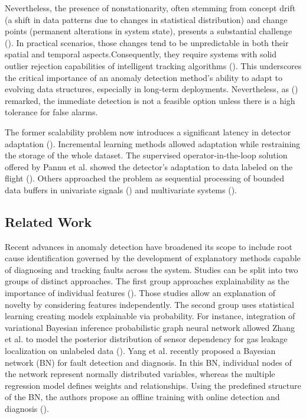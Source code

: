 Nevertheless, the presence of nonstationarity, often stemming from concept drift (a shift in data patterns due to changes in statistical distribution) and change points (permanent alterations in system state), presents a substantial challenge (\cite{Salehi2018}). In practical scenarios, those changes tend to be unpredictable in both their spatial and temporal aspects.Consequently, they require systems with solid outlier rejection capabilities of intelligent tracking algorithms (\cite{Barbosa2019162}). This underscores the critical importance of an anomaly detection method's ability to adapt to evolving data structures, especially in long-term deployments. Nevertheless, as (\cite{Tartakovsky2013}) remarked, the immediate detection is not a feasible option unless there is a high tolerance for false alarms.

The former scalability problem now introduces a significant latency in detector adaptation (\cite{Wu2021}). Incremental learning methods allowed adaptation while restraining the storage of the whole dataset. The supervised operator-in-the-loop solution offered by Pannu et al. showed the detector's adaptation to data labeled on the flight (\cite{Pannu2012}).
Others approached the problem as sequential processing of bounded data buffers in univariate signals (\cite{Ahmad2017134}) and multivariate systems (\cite{Bosman201514}).

\subsection{Related Work}
Recent advances in anomaly detection have broadened its scope to include root cause identification governed by the development of explanatory methods capable of diagnosing and tracking faults across the system. Studies can be split into two groups of distinct approaches. The first group approaches explainability as the importance of individual features (\cite{Carletti2019, Nguyen2019, Amarasinghe2018}). Those studies allow an explanation of novelty by considering features independently. The second group uses statistical learning creating models explainable via probability. For instance, integration of variational Bayesian inference probabilistic graph neural network allowed Zhang et al. to model the posterior distribution of sensor dependency for gas leakage localization on unlabeled data (\cite{ZHANG2023120542}). Yang et al. recently proposed a Bayesian network (BN) for fault detection and diagnosis. In this BN, individual nodes of the network represent normally distributed variables, whereas the multiple regression model defines weights and relationships. Using the predefined structure of the BN, the authors propose an offline training with online detection and diagnosis (\cite{Yang2022}).


